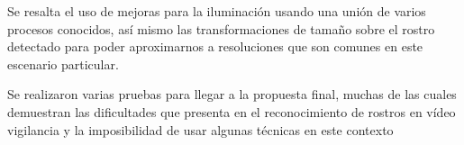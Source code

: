 Se resalta el uso de mejoras para la iluminación usando una unión de varios procesos conocidos, así mismo las transformaciones de tamaño sobre el rostro detectado para poder aproximarnos a resoluciones que son comunes en este escenario particular.

Se realizaron varias pruebas para llegar a la propuesta final, muchas de las cuales demuestran las dificultades que presenta en el reconocimiento de rostros en vídeo vigilancia y la imposibilidad de usar algunas técnicas en este contexto
